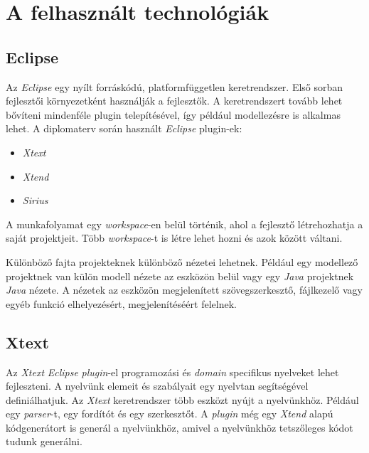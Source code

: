 \clearpage\section{A felhasznált technológiák}
\subsection{Eclipse}

Az \textit{Eclipse} egy nyílt forráskódú, platformfüggetlen keretrendszer.
Első sorban fejlesztői környezetként használják a fejlesztők.
A keretrendszert tovább lehet bővíteni mindenféle plugin telepítésével, így például modellezésre is alkalmas lehet.
A diplomaterv során használt \textit{Eclipse} plugin-ek:

\begin{itemize}
    \item \textit{Xtext}
    \item \textit{Xtend}
    \item \textit{Sirius}
\end{itemize}

A munkafolyamat egy \textit{workspace}-en belül történik, ahol a fejlesztő létrehozhatja a saját projektjeit.
Több \textit{workspace}-t is létre lehet hozni és azok között váltani.

Különböző fajta projekteknek különböző nézetei lehetnek.
Például egy modellező projektnek van külön modell nézete az eszközön belül vagy egy \textit{Java} projektnek \textit{Java} nézete.
A nézetek az eszközön megjelenített szövegszerkesztő, fájlkezelő vagy egyéb funkció elhelyezésért, megjelenítéséért felelnek.

\subsection{Xtext}

Az \textit{Xtext} \textit{Eclipse} \textit{plugin}-el programozási és \textit{domain} specifikus nyelveket lehet fejleszteni.
A nyelvünk elemeit és szabályait egy nyelvtan segítségével definiálhatjuk.
Az \textit{Xtext} keretrendszer több eszközt nyújt a nyelvünkhöz.
Például egy \textit{parser}-t, egy fordítót és egy szerkesztőt.
A \textit{plugin} még egy \textit{Xtend} alapú kódgenerátort is generál a nyelvünkhöz, amivel a nyelvünkhöz tetszőleges kódot tudunk generálni.

